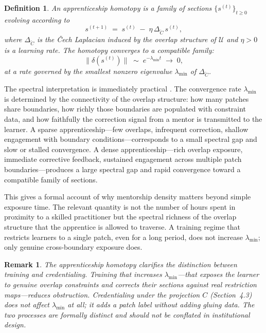 \documentclass[12pt]{article}
\newtheorem{definition}{Definition}
\newtheorem{remark}{Remark}
\begin{document}
\begin{definition}
An \emph{apprenticeship homotopy} is a family of sections $\{s^{(t)}\}_{t \ge 0}$ evolving according to
\begin{equation}
s^{(t+1)} \;=\; s^{(t)} \;-\; \eta\,\Delta_{\check{C}}\, s^{(t)},
\end{equation}
where $\Delta_{\check{C}}$ is the Čech Laplacian induced by the overlap structure of $\mathcal{U}$ and $\eta > 0$ is a learning rate. The homotopy converges to a compatible family:
\begin{equation}
\bigl\|\delta(s^{(t)})\bigr\| \;\sim\; e^{-\lambda_{\min} t} \;\longrightarrow\; 0,
\end{equation}
at a rate governed by the smallest nonzero eigenvalue $\lambda_{\min}$ of $\Delta_{\check{C}}$.
\end{definition}

The spectral interpretation is immediately practical \cite{Simon1962,Simon1996}. The convergence rate $\lambda_{\min}$ is determined by the connectivity of the overlap structure: how many patches share boundaries, how richly those boundaries are populated with constraint data, and how faithfully the correction signal from a mentor is transmitted to the learner. A sparse apprenticeship---few overlaps, infrequent correction, shallow engagement with boundary conditions---corresponds to a small spectral gap and slow or stalled convergence. A dense apprenticeship---rich overlap exposure, immediate corrective feedback, sustained engagement across multiple patch boundaries---produces a large spectral gap and rapid convergence toward a compatible family of sections.

This gives a formal account of why mentorship density matters beyond simple exposure time. The relevant quantity is not the number of hours spent in proximity to a skilled practitioner but the spectral richness of the overlap structure that the apprentice is allowed to traverse. A training regime that restricts learners to a single patch, even for a long period, does not increase $\lambda_{\min}$; only genuine cross-boundary exposure does.

\begin{remark}
The apprenticeship homotopy clarifies the distinction between training and credentialing. Training that increases $\lambda_{\min}$---that exposes the learner to genuine overlap constraints and corrects their sections against real restriction maps---reduces obstruction. Credentialing under the projection $C$ (Section~4.3) does not affect $\lambda_{\min}$ at all; it adds a patch label without adding gluing data. The two processes are formally distinct and should not be conflated in institutional design.
\end{remark}
\end{document}
